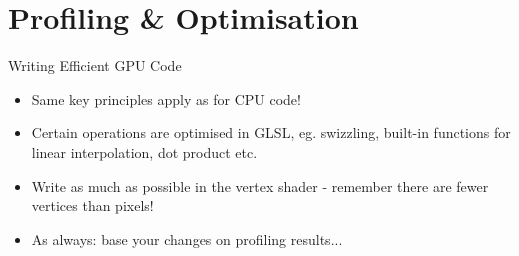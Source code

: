 \part{Profiling \& Optimisation}
\frame{\partpage}

\begin{frame}{Writing Efficient GPU Code}
	\begin{itemize}
		\pause\item Same key principles apply as for CPU code!
		\pause\item Certain operations are optimised in GLSL, eg. swizzling, built-in functions for linear interpolation, dot product etc.
		\pause\item Write as much as possible in the vertex shader - remember there are fewer vertices than pixels!
		\pause\item As always: base your changes on profiling results...
	\end{itemize}
\end{frame}